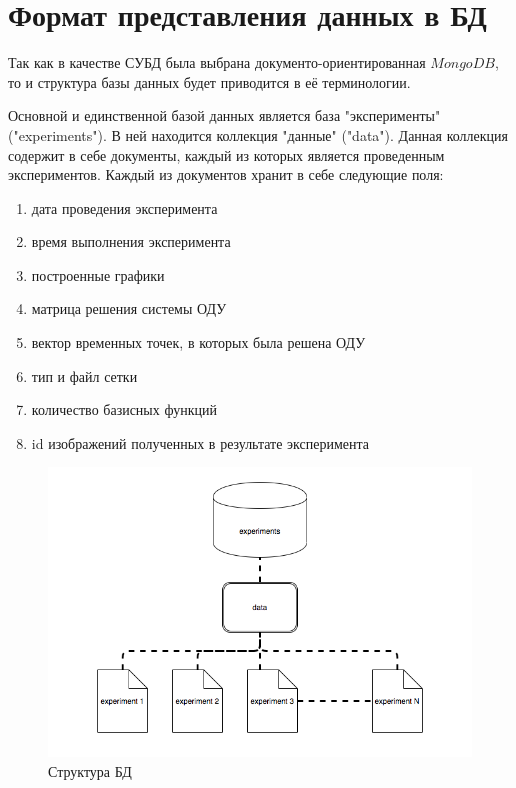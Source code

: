 \documentclass[14pt]{extreport}
\begin{document}
\section{Формат представления данных в БД}

Так как в качестве СУБД была выбрана документо-ориентированная $MongoDB$, то и структура базы данных будет приводится в её терминологии. 

Основной и единственной базой данных является база "эксперименты" ("experiments"). В ней находится коллекция  "данные" ("data"). Данная коллекция содержит в себе документы, каждый из которых является проведенным экспериментов. Каждый из документов хранит в себе следующие поля:

\begin{enumerate}
\item дата проведения эксперимента
\item время выполнения эксперимента
\item построенные графики
\item матрица решения системы ОДУ
\item вектор временных точек, в которых была решена ОДУ
\item тип и файл сетки
\item количество базисных функций
\item id изображений полученных в результате эксперимента
\end{enumerate}


\begin{figure}[H]
\centerline{
\includegraphics[width=1.0\linewidth]{images/database}}
\caption{Структура БД}
\label{img:database}
\end{figure}
\end{document}
